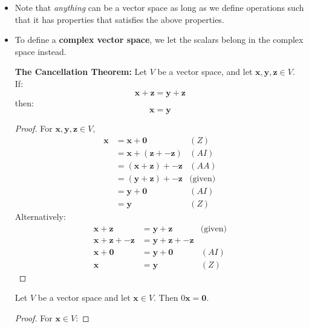 \begin{itemize}
\begin{definition}
\begin{enumerate}
        \end{enumerate}
    \end{definition}
    \item Note that \textit{anything} can be a vector space as long as we define operations such that it has properties that satisfies the above properties.
    \item To define a \textbf{complex vector space}, we let the scalars belong in the complex space instead.
    \begin{theorem}
        \textbf{The Cancellation Theorem:} Let $V$ be a vector space, and let $\bm{x}, \bm{y}, \bm{z} \in V$. If:
        \begin{equation}
            \bm{x}+ \bm{z} = \bm{y}+ \bm{z}
        \end{equation}
        then:
        \begin{equation}
            \bm{x} = \bm{y}
        \end{equation}
        \begin{proof}
            For $\bm{x},\bm{y},\bm{z} \in V$,
            \begin{align*}
                \bm{x} &= \bm{x} + \bm{0} & (Z) \\ 
                &= \bm{x} + (\bm{z} + -\bm{z}) & (AI) \\ 
                &= (\bm{x} + \bm{z}) + -\bm{z} & (AA) \\ 
                &= (\bm{y}+\bm{z}) + -\bm{z} & \text{(given)} \\
                &= \bm{y} + \bm{0} & (AI) \\ 
                &= \bm{y} & (Z)
            \end{align*}
            Alternatively:
            \begin{align*}
                \bm{x} + \bm{z} &= \bm{y} + \bm{z} & \text{(given)} \\ 
                \bm{x} + \bm{z} + -\bm{z} &= \bm{y} + \bm{z} + -\bm{z} \\ 
                \bm{x} + \bm{0} &= \bm{y} + \bm{0} & (AI) \\ 
                \bm{x} &= \bm{y} & (Z)
            \end{align*}
        \end{proof}
    \end{theorem}
    \begin{proposition}
        Let $V$ be a vector space and let $\bm{x} \in V$. Then $0\bm{x} = \bm{0}$.
        \begin{proof}
            For $\bm{x} \in V$:

\end{proof}
\end{proposition}
\end{itemize}
